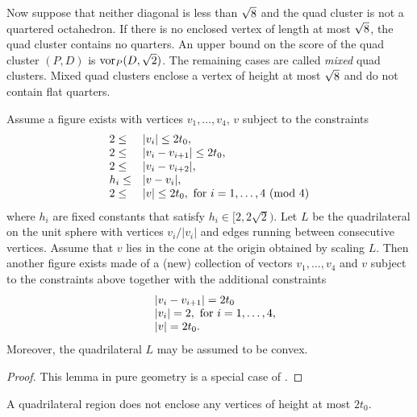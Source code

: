 Now suppose that neither diagonal is less than $\sqrt8$ and the
quad cluster is not a quartered octahedron. If there is no
enclosed vertex of length at most $\sqrt8$, the quad cluster
contains no quarters. An upper bound on the score of the quad
cluster $(P,D)$ is $\operatorname{vor}_P(D,\sqrt2)$. The remaining cases are
called {\it mixed\/} quad clusters. Mixed quad clusters enclose a
vertex of height at most $\sqrt8$ and do not contain flat quarters.

\begin{lemma}\label{lemma:gc}
Assume a figure exists with vertices $v_1,\ldots,v_4$, $v$ subject
to the constraints
    $$\begin{array}{lll}
    2\le &|v_i|\le 2t_0,\\
    2\le&|v_i-v_{i+1}|\le 2t_0, \\
    2\le&|v_i-v_{i+2}|,\\
    h_i\le &|v-v_i|, \\
    2\le &|v|\le 2t_0, \hbox{ for }
        i=1,\ldots,4 \ (\hbox{mod } 4)\\
    \end{array}
    $$
where $h_i$ are fixed constants that satisfy
$h_i\in[2,2\sqrt{2})$. Let $L$ be the quadrilateral on the unit
sphere with vertices $v_i/|v_i|$ and edges running between
consecutive vertices. Assume that $v$ lies in the cone at the
origin obtained by scaling $L$. Then another figure exists made of
a (new) collection of vectors $v_1,\ldots,v_4$ and $v$ subject to
the constraints above together with the additional constraints
    $$\begin{array}{lll}
    &|v_i-v_{i+1}|=2t_0\\
    &|v_i|=2, \hbox { for } i=1,\ldots,4,\\
    &|v|=2t_0.
    \end{array}
    $$
Moreover, the quadrilateral $L$ may be assumed to be convex.
\end{lemma}

\begin{proof} This  lemma in pure geometry is a special case of
\cite[Lemma~4.3]{part1}.
\end{proof}


\begin{lemma}\label{lemma:enclosed} %
A quadrilateral region does not enclose any vertices of height at
most $2t_0$.
\end{lemma}

